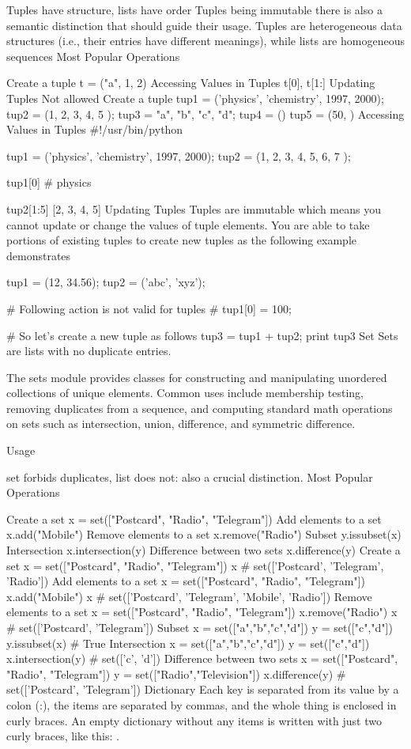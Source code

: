 Tuples have structure, lists have order
Tuples being immutable there is also a semantic distinction that should guide their usage. Tuples are heterogeneous data structures (i.e., their entries have different meanings), while lists are homogeneous sequences
Most Popular Operations

Create a tuple
t = ("a", 1, 2)
Accessing Values in Tuples
t[0], t[1:]
Updating Tuples
Not allowed
Create a tuple
tup1 = ('physics', 'chemistry', 1997, 2000);
tup2 = (1, 2, 3, 4, 5 );
tup3 = "a", "b", "c", "d";
tup4 = ()
tup5 = (50, )
Accessing Values in Tuples
#!/usr/bin/python

tup1 = ('physics', 'chemistry', 1997, 2000);
tup2 = (1, 2, 3, 4, 5, 6, 7 );

tup1[0]
# physics

tup2[1:5]
[2, 3, 4, 5]
Updating Tuples
Tuples are immutable which means you cannot update or change the values of tuple elements. You are able to take portions of existing tuples to create new tuples as the following example demonstrates

tup1 = (12, 34.56);
tup2 = ('abc', 'xyz');

# Following action is not valid for tuples
# tup1[0] = 100;

# So let's create a new tuple as follows
tup3 = tup1 + tup2;
print tup3
Set
Sets are lists with no duplicate entries.

The sets module provides classes for constructing and manipulating unordered collections of unique elements. Common uses include membership testing, removing duplicates from a sequence, and computing standard math operations on sets such as intersection, union, difference, and symmetric difference.

Usage

set forbids duplicates, list does not: also a crucial distinction.
Most Popular Operations

Create a set
x = set(["Postcard", "Radio", "Telegram"])
Add elements to a set
x.add("Mobile")
Remove elements to a set
x.remove("Radio")
Subset
y.issubset(x)
Intersection
x.intersection(y)
Difference between two sets
x.difference(y)
Create a set
x = set(["Postcard", "Radio", "Telegram"])
x
# set(['Postcard', 'Telegram', 'Radio'])
Add elements to a set
x = set(["Postcard", "Radio", "Telegram"])
x.add("Mobile")
x
# set(['Postcard', 'Telegram', 'Mobile', 'Radio'])
Remove elements to a set
x = set(["Postcard", "Radio", "Telegram"])
x.remove("Radio")
x
# set(['Postcard', 'Telegram'])
Subset
x = set(["a","b","c","d"])
y = set(["c","d"])
y.issubset(x)
# True
Intersection
x = set(["a","b","c","d"])
y = set(["c","d"])
x.intersection(y)
# set(['c', 'd'])
Difference between two sets
x = set(["Postcard", "Radio", "Telegram"])
y = set(["Radio","Television"])
x.difference(y)
# set(['Postcard', 'Telegram'])
Dictionary
Each key is separated from its value by a colon (:), the items are separated by commas, and the whole thing is enclosed in curly braces. An empty dictionary without any items is written with just two curly braces, like this: {}.

